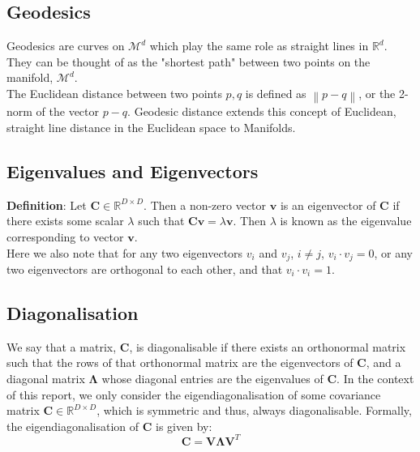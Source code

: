 \documentclass[12pt]{report}
\newcommand\norm[1]{\left\lVert#1\right\rVert}
\begin{document}
\subsection{Geodesics}

Geodesics are curves on $\mathcal{M}^d$
which play the same role as straight
lines in $\mathbb{R}^d$. They can be thought of as the "shortest path"
between two points on the manifold, $\mathcal{M}^d$.\\

The Euclidean distance between two points $p, q$ 
is defined as $\norm{p-q}$, or the 2-norm of the vector $p - q$.
Geodesic distance extends this concept of Euclidean, straight line distance
in the Euclidean space to Manifolds. 


\subsection{Eigenvalues and Eigenvectors}
\textbf{Definition}: Let $\mathbf{C} \in \mathbb{R}^{D \times D}$. 
Then a non-zero vector $\mathbf{v}$ is an eigenvector of $\mathbf{C}$ 
if there exists some scalar $\lambda$ such that $\mathbf{C}\mathbf{v} = \lambda \mathbf{v}$. 
Then $\lambda$ is known as the eigenvalue corresponding to vector $\mathbf{v}$.\\
Here we also note that for any two eigenvectors $v_i$ and $v_j$, $i \neq j$, $v_i \cdot v_j = 0$, 
or any two eigenvectors are orthogonal to each other, and that $v_i \cdot v_i = 1$.

\subsection{Diagonalisation}
We say that a matrix, $\mathbf{C}$, is diagonalisable if there exists 
an orthonormal matrix such that the rows of that orthonormal matrix 
are the eigenvectors of $\mathbf{C}$, and a diagonal matrix 
$\mathbf{\Lambda}$ whose diagonal entries are the eigenvalues of $\mathbf{C}$.
In the context of this report, we only consider 
the eigendiagonalisation of some covariance matrix 
$\mathbf{C} \in \mathbb{R}^{D \times D}$,
which is symmetric and thus, always diagonalisable. Formally,
the eigendiagonalisation of $\mathbf{C}$ is given by:
$$\mathbf{C} = \mathbf{V}\mathbf{\Lambda}\mathbf{V}^T$$
\end{document}
